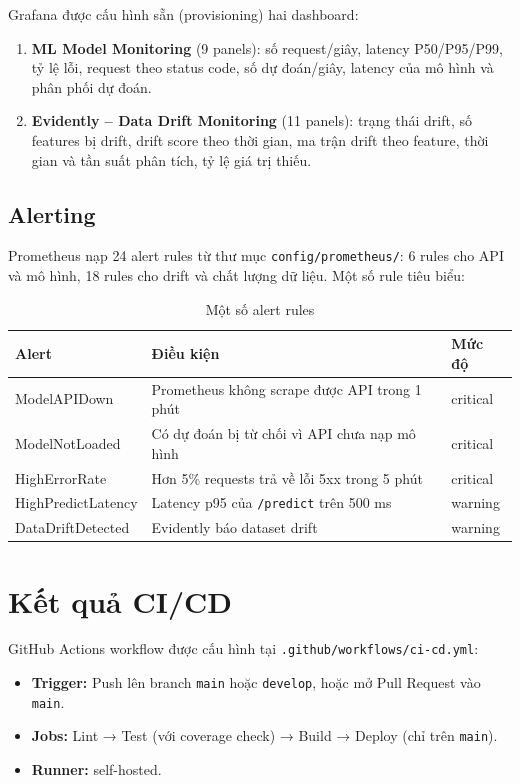 \documentclass[12pt,a4paper]{report}
\begin{document}
Grafana được cấu hình sẵn (provisioning) hai dashboard:
\begin{enumerate}
  \item \textbf{ML Model Monitoring} (9 panels): số request/giây, latency P50/P95/P99, tỷ lệ lỗi, request theo status code, số dự đoán/giây, latency của mô hình và phân phối dự đoán.
  \item \textbf{Evidently -- Data Drift Monitoring} (11 panels): trạng thái drift, số features bị drift, drift score theo thời gian, ma trận drift theo feature, thời gian và tần suất phân tích, tỷ lệ giá trị thiếu.
\end{enumerate}

\subsection{Alerting}

Prometheus nạp 24 alert rules từ thư mục \texttt{config/prometheus/}: 6 rules cho API và mô hình, 18 rules cho drift và chất lượng dữ liệu. Một số rule tiêu biểu:

\begin{table}[H]
  \centering
  \caption{Một số alert rules}
  \label{tab:alerts}
  \begin{tabularx}{\textwidth}{lXl}
    \toprule
    \textbf{Alert} & \textbf{Điều kiện} & \textbf{Mức độ} \\
    \midrule
    ModelAPIDown        & Prometheus không scrape được API trong 1 phút        & critical \\
    ModelNotLoaded      & Có dự đoán bị từ chối vì API chưa nạp mô hình        & critical \\
    HighErrorRate       & Hơn 5\% requests trả về lỗi 5xx trong 5 phút         & critical \\
    HighPredictLatency  & Latency p95 của \texttt{/predict} trên 500 ms        & warning \\
    DataDriftDetected   & Evidently báo dataset drift                          & warning \\
    \bottomrule
  \end{tabularx}
\end{table}

\section{Kết quả CI/CD}

GitHub Actions workflow được cấu hình tại \texttt{.github/workflows/ci-cd.yml}:
\begin{itemize}
  \item \textbf{Trigger:} Push lên branch \texttt{main} hoặc \texttt{develop}, hoặc mở Pull Request vào \texttt{main}.
  \item \textbf{Jobs:} Lint → Test (với coverage check) → Build → Deploy (chỉ trên \texttt{main}).
  \item \textbf{Runner:} self-hosted.
\end{itemize}
\end{document}
